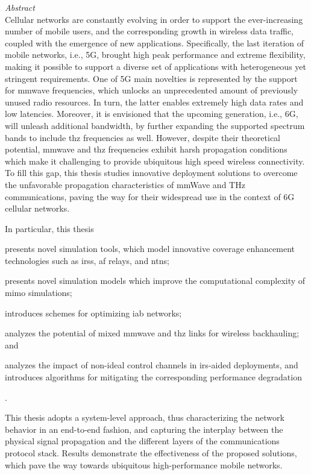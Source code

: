 {\noindent\huge\itshape Abstract}\\
%

Cellular networks are constantly evolving in order to support the ever-increasing number of mobile users, and the corresponding growth in wireless data traffic, coupled with the emergence of new applications. 
Specifically, the last iteration of mobile networks, i.e., 5G, brought high peak performance and extreme flexibility, making it possible to support a diverse set of applications with heterogeneous yet stringent requirements. 
One of 5G main novelties is represented by the support for \gls{mmwave} frequencies, which unlocks an unprecedented amount of previously unused radio resources. In turn, the latter enables extremely high data rates and low latencies. Moreover, it is envisioned that the upcoming generation, i.e., 6G, will unleash additional bandwidth, by further expanding the supported spectrum bands to include \gls{thz} frequencies as well. 
However, despite their theoretical potential, \gls{mmwave} and \gls{thz} frequencies exhibit harsh propagation conditions which make it challenging to provide ubiquitous high speed wireless connectivity. 
To fill this gap, this thesis studies innovative deployment solutions to overcome the unfavorable propagation characteristics of mmWave and THz communications, paving the way for their widespread use in the context of 6G cellular networks. 

In particular, this thesis
\begin{enumerate*}[label=(\roman*)]
    \item presents novel simulation tools, which model innovative coverage enhancement technologies such as \glspl{irs}, \gls{af} relays, and \glspl{ntn};
    \item presents novel simulation models which improve the computational complexity of \gls{mimo} simulations;
    \item introduces schemes for optimizing \gls{iab} networks;
    \item analyzes the potential of mixed \gls{mmwave} and \gls{thz} links for wireless backhauling; and
    \item analyzes the impact of non-ideal control channels in \gls{irs}-aided deployments, and introduces algorithms for mitigating the corresponding performance degradation
\end{enumerate*}.

This thesis adopts a system-level approach, thus characterizing the network behavior in an end-to-end fashion, and capturing the interplay between the physical signal propagation and the different layers of the communications protocol stack. Results demonstrate the effectiveness of the proposed solutions, which pave the way towards ubiquitous high-performance mobile networks.